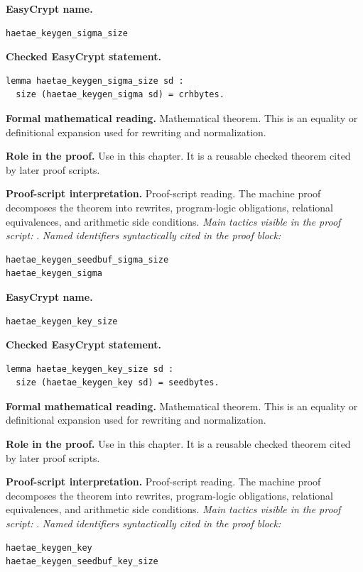 \begin{formaltheorem}
\noindent\textbf{EasyCrypt name.}
\begin{lstlisting}[language=EasyCrypt,basicstyle=\ttfamily\scriptsize]
haetae_keygen_sigma_size
\end{lstlisting}
\noindent\textbf{Checked EasyCrypt statement.}
\begin{lstlisting}[language=EasyCrypt,basicstyle=\ttfamily\scriptsize]
lemma haetae_keygen_sigma_size sd :
  size (haetae_keygen_sigma sd) = crhbytes.
\end{lstlisting}
\noindent\textbf{Formal mathematical reading.}
Mathematical theorem. This is an equality or definitional expansion used for rewriting and normalization.

\noindent\textbf{Role in the proof.}
Use in this chapter. It is a reusable checked theorem cited by later proof scripts.

\noindent\textbf{Proof-script interpretation.}
Proof-script reading. The machine proof decomposes the theorem into rewrites, program-logic obligations, relational equivalences, and arithmetic side conditions.
\emph{Main tactics visible in the proof script:} .
\emph{Named identifiers syntactically cited in the proof block:}
\begin{lstlisting}[language=EasyCrypt,basicstyle=\ttfamily\scriptsize]
haetae_keygen_seedbuf_sigma_size
haetae_keygen_sigma
\end{lstlisting}

\end{formaltheorem}

\begin{formaltheorem}
\noindent\textbf{EasyCrypt name.}
\begin{lstlisting}[language=EasyCrypt,basicstyle=\ttfamily\scriptsize]
haetae_keygen_key_size
\end{lstlisting}
\noindent\textbf{Checked EasyCrypt statement.}
\begin{lstlisting}[language=EasyCrypt,basicstyle=\ttfamily\scriptsize]
lemma haetae_keygen_key_size sd :
  size (haetae_keygen_key sd) = seedbytes.
\end{lstlisting}
\noindent\textbf{Formal mathematical reading.}
Mathematical theorem. This is an equality or definitional expansion used for rewriting and normalization.

\noindent\textbf{Role in the proof.}
Use in this chapter. It is a reusable checked theorem cited by later proof scripts.

\noindent\textbf{Proof-script interpretation.}
Proof-script reading. The machine proof decomposes the theorem into rewrites, program-logic obligations, relational equivalences, and arithmetic side conditions.
\emph{Main tactics visible in the proof script:} .
\emph{Named identifiers syntactically cited in the proof block:}
\begin{lstlisting}[language=EasyCrypt,basicstyle=\ttfamily\scriptsize]
haetae_keygen_key
haetae_keygen_seedbuf_key_size
\end{lstlisting}

\end{formaltheorem}

